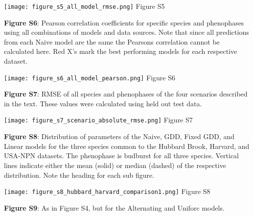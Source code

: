 \documentclass[a4paper,12pt]{article}
\begin{document}
\newpage

\begin{center}
	\centering
		\texttt{[image: figure\_s5\_all\_model\_rmse.png]}
	Figure S5
\end{center}

\newpage
\textbf{Figure S6}: Pearson correlation coefficients for specific species and phenophases using all combinations of models and data sources. Note that since all predictions from each Naive model are the same the Pearsons correlation cannot be calculated here. Red X's mark the best performing models for each respective dataset.

\newpage

\begin{center}
	\centering
		\texttt{[image: figure\_s6\_all\_model\_pearson.png]}
	Figure S6
\end{center}


\newpage

\textbf{Figure S7}: RMSE of all species and phenophases of the four scenarios described in the text. These values were calculated using held out test data.

\newpage

\begin{center}
	\centering
		\texttt{[image: figure\_s7\_scenario\_absolute\_rmse.png]}
	Figure S7
\end{center}

\newpage

\textbf{Figure S8}: Distribution of parameters of the Naive, GDD, Fixed GDD, and Linear models for the three species common to the Hubbard Brook, Harvard, and USA-NPN datasets. The phenophase is budburst for all three species. Vertical lines indicate either the mean (solid) or median (dashed) of the respective distribution. Note the heading for each sub figure. 

\newpage

\begin{center}
	\centering
		\texttt{[image: figure\_s8\_hubbard\_harvard\_comparison1.png]}
	Figure S8
\end{center}

\newpage

\textbf{Figure S9}: As in Figure S4, but for the Alternating and Uniforc models. 
\end{document}
